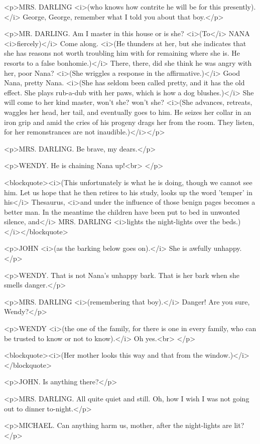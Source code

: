<p>MRS. DARLING <i>(who knows how contrite he will be for this
presently).</i> George, George, remember what I told you about that
boy.</p>

<p>MR. DARLING. Am I master in this house or is she? <i>(To</i> NANA
<i>fiercely)</i> Come along. <i>(He thunders at her, but she
indicates that she has reasons not worth troubling him with for
remaining where she is. He resorts to a false bonhomie.)</i> There,
there, did she think he was angry with her, poor Nana? <i>(She
wriggles a response in the affirmative.)</i> Good Nana, pretty Nana.
<i>(She has seldom been called pretty, and it has the old effect. She
plays rub-a-dub with her paws, which is how a dog blushes.)</i> She
will come to her kind master, won't she? won't she? <i>(She advances,
retreats, waggles her head, her tail, and eventually goes to him. He
seizes her collar in an iron grip and amid the cries of his progeny
drags her from the room. They listen, for her remonstrances are not
inaudible.)</i></p>

<p>MRS. DARLING. Be brave, my dears.</p>

<p>WENDY. He is chaining Nana up!<br>
</p>

<blockquote><i>(This unfortunately is what he is doing, though we
cannot see him. Let us hope that he then retires to his study, looks
up the word 'temper' in his</i> Thesaurus, <i>and under the influence
of those benign pages becomes a better man. In the meantime the
children have been put to bed in unwonted silence, and</i> MRS.
DARLING <i>lights the night-lights over the beds.)</i></blockquote>

<p>JOHN <i>(as the barking below goes on).</i> She is awfully
unhappy.</p>

<p>WENDY. That is not Nana's unhappy bark. That is her bark when she
smells danger.</p>

<p>MRS. DARLING <i>(remembering that boy).</i> Danger! Are you sure,
Wendy?</p>

<p>WENDY <i>(the one of the family, for there is one in every family,
who can be trusted to know or not to know).</i> Oh yes.<br>
</p>

<blockquote><i>(Her mother looks this way and that from the
window.)</i></blockquote>

<p>JOHN. Is anything there?</p>

<p>MRS. DARLING. All quite quiet and still. Oh, how I wish I was not
going out to dinner to-night.</p>

<p>MICHAEL. Can anything harm us, mother, after the night-lights are
lit?</p>

